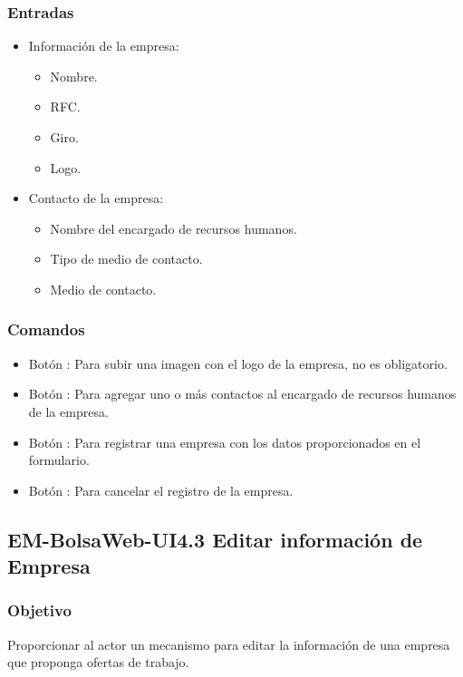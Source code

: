 \subsubsection{Entradas}
	\begin{itemize}
		\item Información de la empresa:
		\begin{itemize}
			\item Nombre.
			\item RFC.
			\item Giro.
			\item Logo.
		\end{itemize}
		\item Contacto de la empresa:
		\begin{itemize}
			\item Nombre del encargado de recursos humanos.
			\item Tipo de medio de contacto. 
			\item Medio de contacto. 
		\end{itemize}
	\end{itemize}

\subsubsection{Comandos}
 	\begin{itemize}
		\item Botón : Para subir una imagen con el logo de la empresa, no es obligatorio.  
		\item Botón \IUbutton{+}: Para agregar uno o más contactos al encargado de recursos humanos de la empresa.
		\item Botón : Para registrar una empresa con los datos proporcionados en el formulario.
		\item Botón : Para cancelar el registro de la empresa.
	\end{itemize}




\subsection{EM-BolsaWeb-UI4.3 Editar información de Empresa}

\subsubsection{Objetivo}
	\noindent
	Proporcionar al actor un mecanismo para editar la información de una empresa que proponga ofertas de trabajo.
